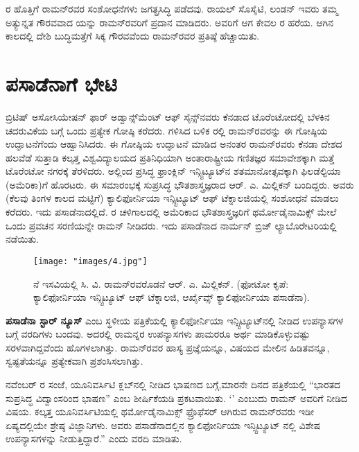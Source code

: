 ರ ಹೊತ್ತಿಗೆ ರಾಮನ್‍ರವರ ಸಂಶೋಧನೆಗಳು ಜಗತ್ಪ್ರಸಿದ್ಧಿ ಪಡೆದವು. ರಾಯಲ್ ಸೊಸೈಟಿ, ಲಂಡನ್ \enginline{-} ಇವರು ತಮ್ಮ ಅತ್ಯುನ್ನತ ಗೌರವವಾದ  ಯನ್ನು ರಾಮನ್‍ರವರಿಗೆ ಪ್ರದಾನ ಮಾಡಿದರು. ಅವರಿಗೆ ಆಗ ಕೇವಲ ರ ಹರೆಯ. ಆಗಿನ ಕಾಲದಲ್ಲಿ ದೇಶಿ ಬುದ್ಧಿಮತ್ತೆಗೆ ಸಿಕ್ಕ ಗೌರವವೆಂದು ರಾಮನ್‍ರವರ ಪ್ರತಿಷ್ಠೆ ಹೆಚ್ಚಾಯಿತು.


\section{ಪಸಾಡೆನಾಗೆ ಭೇಟಿ}

ಬ್ರಿಟಿಷ್ ಅಸೋಸಿಯೇಷನ್ ಫಾರ್ ಅಡ್ವಾನ್ಸ್‌ಮೆಂಟ್ ಆಫ್ ಸೈನ್ಸ್‌ನವರು ಕೆನಡಾದ ಟೊರೆಂಟೋದಲ್ಲಿ ಬೆಳಕಿನ ಚದರುವಿಕೆಯ ಬಗ್ಗೆ ಒಂದು ಪ್ರತ್ಯೇಕ ಗೋಷ್ಠಿ ಕರೆದರು.  ಗಳಿಸಿದ ಬಳಿಕ ರಲ್ಲಿ ರಾಮನ್‍ರವರನ್ನು ಈ ಗೋಷ್ಠಿಯ ಉದ್ಘಾಟನೆಗೆಂದು ಆಹ್ವಾನಿಸಿದರು. ಈ ಗೋಷ್ಠಿಯ ಉದ್ಘಾಟನೆ ಮಾಡಿದ ಅನಂತರ ರಾಮನ್‍ರವರು ಕೆನಡಾ ದೇಶದ ಹಲವೆಡೆ ಸುತ್ತಾಡಿ ಕಲ್ಕತ್ತ ವಿಶ್ವವಿದ್ಯಾಲಯದ ಪ್ರತಿನಿಧಿಯಾಗಿ ಅಂತಾರಾಷ್ಟ್ರೀಯ ಗಣಿತಜ್ಞರ ಸಮಾವೇಶಕ್ಕಾಗಿ ಮತ್ತೆ ಟೊರೆಂಟೋ ನಗರಕ್ಕೆ ತೆರಳಿದರು. ಅಲ್ಲಿಂದ ಪ್ರಸಿದ್ಧ ಫ್ರಾಂಕ್ಲಿನ್ ಇನ್ಸ್ಟಿಟ್ಯೂಟ್‍ನ ಶತಮಾನೋತ್ಸವಕ್ಕಾಗಿ ಫಿಲಡೆಲ್ಫಿಯಾ (ಅಮೆರಿಕಾ)ಗೆ ಹೊರಟರು. ಈ ಸಮಾರಂಭಕ್ಕೆ ಸುಪ್ರಸಿದ್ಧ ಭೌತಶಾಸ್ತ್ರಜ್ಞರಾದ ಆರ್. ಎ. ಮಿಲ್ಲಿಕನ್ ಬಂದಿದ್ದರು. ಅವರು (ಕೆಲವು ತಿಂಗಳ ಕಾಲದ ಮಟ್ಟಿಗೆ) ಕ್ಯಾಲಿಫೋರ್ನಿಯಾ ಇನ್ಸ್ಟಿಟ್ಯೂಟ್ ಆಫ್ ಟೆಕ್ನಾಲಜಿಯಲ್ಲಿ ಸಂಶೋಧನೆ ಮಾಡಲು ಕರೆದರು. ಇದು ಪಸಾಡೆನಾದಲ್ಲಿದೆ. ರ ಚಳಿಗಾಲದಲ್ಲಿ ಅಮೆರಿಕಾದ ಭೌತಶಾಸ್ತ್ರಜ್ಞರಿಗೆ ಥರ್ಮೋಡೈನಾಮಿಕ್ಸ್ ಮೇಲೆ ಒಂದು ಪ್ರವಚನ ಸರಣಿಯನ್ನೇ ರಾಮನ್ ನೀಡಿದರು. ಇದು ಪಸಾಡೆನಾದ ನಾರ್ಮನ್ ಬ್ರಿಜ್ ಲ್ಯಾಬೊರೇಟರಿಯಲ್ಲಿ ನಡೆಯಿತು.

\begin{figure}[!h]
\texttt{[image: "images/4.jpg"]}
\caption{ನೆ ಇಸವಿಯಲ್ಲಿ ಸಿ. ವಿ. ರಾಮನ್‍ರವರೊಡನೆ ಆರ್. ಎ. ಮಿಲ್ಲಿಕನ್. (ಫೋಟೋ ಕೃಪೆ: ಕ್ಯಾಲಿಫೋರ್ನಿಯಾ ಇನ್ಸ್ಟಿಟ್ಯೂಟ್ ಆಫ್ ಟೆಕ್ನಾಲಜಿ, ಆರ್ಖೈವ್ಸ್ ಕ್ಯಾಲಿಫೋರ್ನಿಯಾ ಪಸಾಡೆನಾ).}\label{chap1-fig05}
\end{figure}

\textbf{ಪಸಾಡೆನಾ ಸ್ಟಾರ್ ನ್ಯೂಸ್} ಎಂಬ ಸ್ಥಳೀಯ ಪತ್ರಿಕೆಯಲ್ಲಿ ಕ್ಯಾಲಿಫೋರ್ನಿಯಾ ಇನ್ಸ್ಟಿಟ್ಯೂಟ್‍ನಲ್ಲಿ ನೀಡಿದ ಉಪನ್ಯಾಸಗಳ ಬಗ್ಗೆ ವರದಿಗಳು ಬಂದವು. ಅದರಲ್ಲಿ ರಾಮನ್ನರ ಉಪನ್ಯಾಸಗಳು ಪಾಮರರೂ ಅರ್ಥ ಮಾಡಿಕೊಳ್ಳುವಷ್ಟು ಸರಳವಾಗಿದ್ದವೆಂದು ಹೊಗಳಲಾಗಿತ್ತು. ರಾಮನ್‍ರವರ ಹಾಸ್ಯ ಪ್ರಜ್ಞೆಯನ್ನೂ, ವಿಷಯದ ಮೇಲಿನ ಹಿಡಿತವನ್ನೂ, ಸ್ವಷ್ಟತೆಯನ್ನೂ ಪ್ರತ್ಯೇಕವಾಗಿ ಪ್ರಶಂಸಿಸಲಾಗಿತ್ತು.

 ನವೆಂಬರ್ ರ ಸಂಜೆ, ಯೂನಿವರ್ಸಿಟಿ ಕ್ಲಬ್‍ನಲ್ಲಿ ನೀಡಿದ ಭಾಷಣದ ಬಗ್ಗೆ,\break ಮಾರನೇ ದಿನದ ಪತ್ರಿಕೆಯಲ್ಲಿ “ಭಾರತದ ಸುಪ್ರಸಿದ್ಧ ವಿದ್ವಾಂಸರಿಂದ ಭಾಷಣ” ಎಂಬ ಶೀರ್ಷಿಕೆಯಡಿ ಪ್ರಕಟವಾಯಿತು. ‘\textit{}’ ಎಂಬುದು ರಾಮನ್ ಅವರಿಗೆ ನೀಡಿದ ವಿಷಯ. ಕಲ್ಕತ್ತ ಯೂನಿವರ್ಸಿಟಿಯಲ್ಲಿ ಥರ್ಮೋಡೈನಾಮಿಕ್ಸ್ ಫ್ರೊಫೆಸರ್ ಆಗಿರುವ ರಾಮನ್‍ರವರು ಇಡೀ ಏಷ್ಯದಲ್ಲಿಯೇ ಶ್ರೇಷ್ಠ ವಿಜ್ಞಾನಿಗಳು. ಅವರು ಪಸಾಡೆನಾದಲ್ಲಿನ ಕ್ಯಾಲಿಫೋರ್ನಿಯಾ ಇನ್ಸ್ಟಿಟ್ಯೂಟ್ ನಲ್ಲಿ ವಿಶೇಷ ಉಪನ್ಯಾಸಗಳನ್ನು ನೀಡುತ್ತಿದ್ದಾರೆ.” ಎಂದು ವರದಿ ಮಾಡಿತು.


